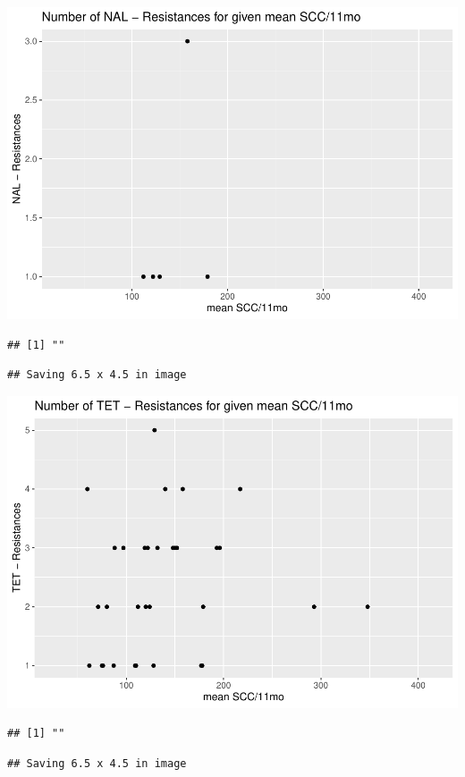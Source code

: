 \documentclass[
]{article}
\begin{document}
\includegraphics{NResistenzen_files/figure-latex/numerical_variables-17.pdf}

\begin{verbatim}
## [1] ""
\end{verbatim}

\begin{verbatim}
## Saving 6.5 x 4.5 in image
\end{verbatim}

\includegraphics{NResistenzen_files/figure-latex/numerical_variables-18.pdf}

\begin{verbatim}
## [1] ""
\end{verbatim}

\begin{verbatim}
## Saving 6.5 x 4.5 in image
\end{verbatim}
\end{document}
